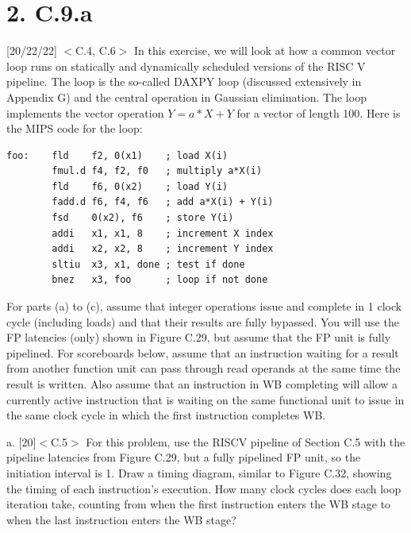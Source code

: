 \documentclass[11pt]{article}
\begin{document}
\section*{2. C.9.a}

 [20/22/22] $<$C.4, C.6$>$ In this exercise, we will look at how a common vector loop runs on statically and dynamically scheduled versions of the RISC V pipeline. The loop is the so-called DAXPY loop (discussed extensively in Appendix G) and the central operation in Gaussian elimination. The loop implements the vector operation $Y=a*X+Y$ for a vector of length 100. Here is the MIPS code for the loop:

\begin{verbatim}
foo:    fld    f2, 0(x1)    ; load X(i)
        fmul.d f4, f2, f0   ; multiply a*X(i)
        fld    f6, 0(x2)    ; load Y(i)
        fadd.d f6, f4, f6   ; add a*X(i) + Y(i)
        fsd    0(x2), f6    ; store Y(i)
        addi   x1, x1, 8    ; increment X index
        addi   x2, x2, 8    ; increment Y index
        sltiu  x3, x1, done ; test if done
        bnez   x3, foo      ; loop if not done
\end{verbatim}

For parts (a) to (c), assume that integer operations issue and complete in 1 clock cycle (including loads) and that their results are fully bypassed. You will use the FP latencies (only) shown in Figure C.29, but assume that the FP unit is fully pipelined. For scoreboards below, assume that an instruction waiting for a result from another function unit can pass through read operands at the same time the result is written. Also assume that an instruction in WB completing will allow a currently active instruction that is waiting on the same functional unit to issue in the same clock cycle in which the first instruction completes WB.

a. [20]$<$C.5$>$ For this problem, use the RISCV pipeline of Section C.5 with the pipeline latencies from Figure C.29, but a fully pipelined FP unit, so the initiation interval is 1. Draw a timing diagram, similar to Figure C.32, showing the timing of each instruction's execution. How many clock cycles does each loop iteration take, counting from when the first instruction enters the WB stage to when the last instruction enters the WB stage?
\newpage
\end{document}
